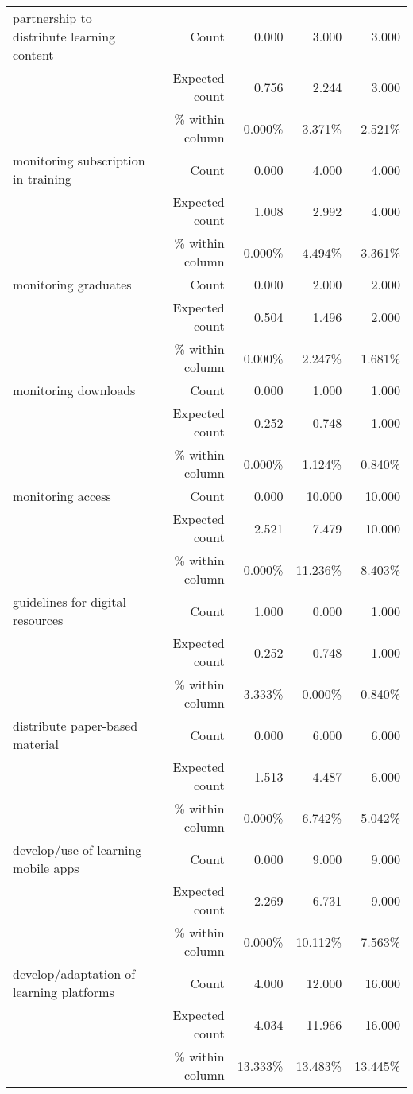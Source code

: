 \documentclass[6pt, oneside]{article}   	%
\begin{document}
\begin{table}[h]
{\begin{tabular}{lrrrr}
			partnership to distribute learning content & Count & 0.000 & 3.000 & 3.000  \\
			 & Expected count & 0.756 & 2.244 & 3.000  \\
			 &  \% within column & 0.000\% & 3.371\% & 2.521\%  \\
			monitoring subscription in training & Count & 0.000 & 4.000 & 4.000  \\
			 & Expected count & 1.008 & 2.992 & 4.000  \\
			 &  \% within column & 0.000\% & 4.494\% & 3.361\%  \\
			monitoring graduates & Count & 0.000 & 2.000 & 2.000  \\
			 & Expected count & 0.504 & 1.496 & 2.000  \\
			 &  \% within column & 0.000\% & 2.247\% & 1.681\%  \\
			monitoring downloads & Count & 0.000 & 1.000 & 1.000  \\
			 & Expected count & 0.252 & 0.748 & 1.000  \\
			 &  \% within column & 0.000\% & 1.124\% & 0.840\%  \\
			monitoring access & Count & 0.000 & 10.000 & 10.000  \\
			 & Expected count & 2.521 & 7.479 & 10.000  \\
			 &  \% within column & 0.000\% & 11.236\% & 8.403\%  \\
			guidelines for digital resources & Count & 1.000 & 0.000 & 1.000  \\
			 & Expected count & 0.252 & 0.748 & 1.000  \\
			 &  \% within column & 3.333\% & 0.000\% & 0.840\%  \\
			distribute paper-based material & Count & 0.000 & 6.000 & 6.000  \\
			 & Expected count & 1.513 & 4.487 & 6.000  \\
			 &  \% within column & 0.000\% & 6.742\% & 5.042\%  \\
			develop/use of learning mobile apps & Count & 0.000 & 9.000 & 9.000  \\
			 & Expected count & 2.269 & 6.731 & 9.000  \\
			 &  \% within column & 0.000\% & 10.112\% & 7.563\%  \\
			develop/adaptation of learning platforms & Count & 4.000 & 12.000 & 16.000  \\
			 & Expected count & 4.034 & 11.966 & 16.000  \\
			 &  \% within column & 13.333\% & 13.483\% & 13.445\%  \\

\end{tabular}}
\end{table}
\end{document}
